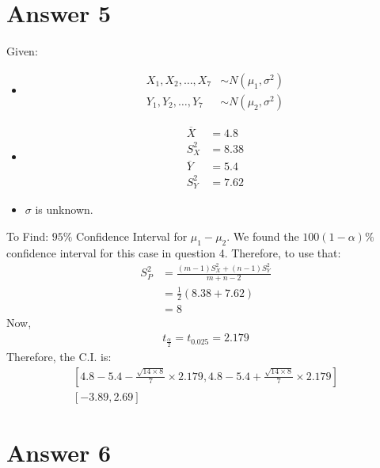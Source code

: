 \documentclass[a4paper]{article}
\begin{document}
\section{Answer 5}
Given:
\begin{itemize}
	\item {
		\begin{equation*}
			\begin{split}
				X_1,X_2,\dots,X_7 &\sim N\left( \mu_1,\sigma^2 \right)\\
				Y_1,Y_2,\dots,Y_7 &\sim N\left( \mu_2,\sigma^2 \right)
			\end{split}
		\end{equation*}
		}
	\item{
		\begin{equation*}
			\begin{split}
				\overline{X} &=  4.8\\
				S_X^2 &= 8.38\\
				\overline{Y} &= 5.4\\
				S_Y^2 &= 7.62
			\end{split}
		\end{equation*}
		}
	\item{$\sigma$ is unknown.}
\end{itemize}
To Find: $95\%$ Confidence Interval for  $\mu_1-\mu_2$.
\newline\newline
We found the $100\left( 1-\alpha \right) \%$ confidence interval for this case in question 4. Therefore, to use that:
\begin{equation*}
	\begin{split}
		S_P^2 &= \frac{\left( m-1 \right) S_X^2 + \left( n-1 \right) S_Y^2}{m+n-2}\\
		&= \frac{1}{2} \left( 8.38 + 7.62 \right)\\
		&= 8
	\end{split}
\end{equation*}
Now,
\begin{equation*}
	\begin{split}
		t_{\frac{\alpha}{2}} = t_{0.025} = 2.179
	\end{split}
\end{equation*}
Therefore, the C.I. is:
\begin{equation*}
	\begin{split}
		\left[ 4.8-5.4 - \frac{\sqrt{14\times 8}}{7}\times 2.179, 4.8 - 5.4 + \frac{\sqrt{14\times 8} }{7} \times 2.179 \right] 	\\
		\left[ -3.89, 2.69 \right] 
	\end{split}
\end{equation*}
\newpage
\section{Answer 6}
\end{document}
